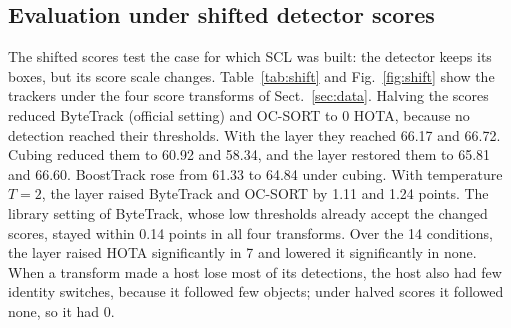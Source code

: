 \documentclass[pdflatex,sn-mathphys-num,iicol]{sn-jnl}
\newcommand{\scl}{SCL}
\begin{document}
\subsection{Evaluation under shifted detector scores}\label{sec:shift}
The shifted scores test the case for which \scl{} was built: the detector keeps its boxes, but its
score scale changes. Table~\ref{tab:shift} and Fig.~\ref{fig:shift} show the trackers under the four
score transforms of Sect.~\ref{sec:data}. Halving the scores reduced ByteTrack (official setting)
and OC-SORT to 0 HOTA, because no detection reached their thresholds. With the layer they reached
66.17 and 66.72. Cubing reduced them to 60.92 and 58.34, and the layer restored them to 65.81 and
66.60. BoostTrack rose from 61.33 to 64.84 under cubing. With temperature $T=2$, the layer raised
ByteTrack and OC-SORT by 1.11 and 1.24 points. The library setting of ByteTrack, whose low
thresholds already accept the changed scores, stayed within 0.14 points in all four transforms.
Over the 14 conditions, the layer raised HOTA significantly in 7 and lowered it significantly in
none. When a transform made a host lose most of its detections, the host also had few identity
switches, because it followed few objects; under halved scores it followed none, so it had 0.
\end{document}
